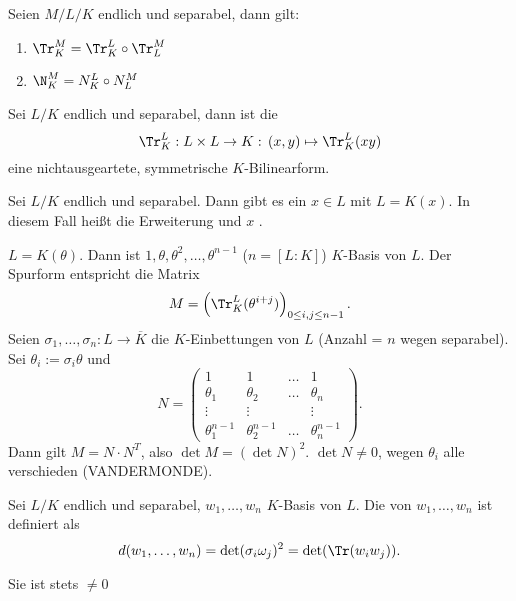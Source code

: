 \begin{Fakt}
 Seien $M/L/K$ endlich und separabel, dann gilt:
 \begin{enumerate}
  \item $\Tr_K^M=\Tr_K^L \circ \Tr_L^M$
  \item $\N_K^M=N_K^L \circ N_L^M$
 \end{enumerate}
\end{Fakt}

\begin{Fakt}
 Sei $L/K$ endlich und separabel, dann ist die 
 \[ \Tr_K^L: L\times L\rightarrow K: \, (x,y)\mapsto \Tr_K^L(xy) \]
 eine nichtausgeartete, symmetrische $K$-Bilinearform.
\end{Fakt}

\begin{Satz}
 Sei $L/K$ endlich und separabel. Dann gibt es ein $x\in L$ mit $L=K(x)$. In diesem Fall heißt die Erweiterung  und $x$ .
\end{Satz}

\begin{Beweis}
 $L=K(\theta)$. Dann ist $1,\theta,\theta^2,\ldots,\theta^{n-1}$ ($n=[L:K]$) $K$-Basis von $L$. Der Spurform entspricht die Matrix 
 \[ M=\left(\Tr_K^L(\theta^{i+j})\right)_{0\leq i,j\leq n-1}.\]
 Seien $\sigma_1,\ldots, \sigma_n:L\rightarrow \overline{K}$ die $K$-Einbettungen von $L$ (Anzahl = $n$ wegen separabel). Sei $\theta_i:=\sigma_i\theta$ und 
 \[ N= \begin{pmatrix}
        1 & 1 &\hdots & 1\\
        \theta_1 & \theta_2 &\hdots & \theta_n\\
        \vdots & \vdots & & \vdots\\
        \theta_1^{n-1} & \theta_2^{n-1} & \hdots& \theta_n^{n-1}
       \end{pmatrix}.
\]
Dann gilt $M=N\cdot N^T$, also $\det M=(\det N)^2$. $\det N\neq 0$, wegen $\theta_i$ alle verschieden (VANDERMONDE).
\end{Beweis}

\begin{Folgerung}
 Sei $L/K$ endlich und separabel, $w_1,\ldots, w_n$ $K$-Basis von $L$. Die  von $w_1,\ldots,w_n$ ist definiert als
 \[ d(w_1,\ldots,w_n)=\det(\sigma_i\omega_j)^2=\det(\Tr(w_iw_j)). \]

 Sie ist stets $\neq 0$
 \end{Folgerung}
 
